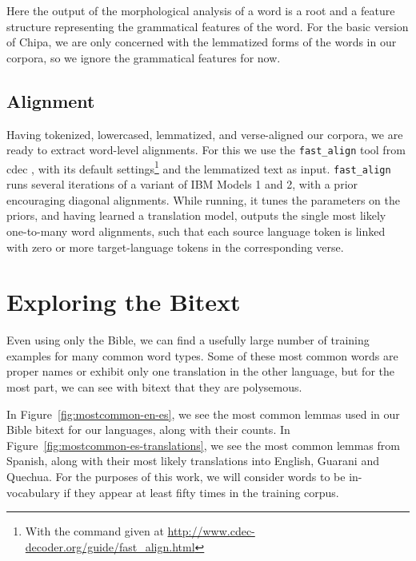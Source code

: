 Here the output of the morphological analysis of a word is a root and a feature
structure representing the grammatical features of the word.  For the basic
version of Chipa, we are only concerned with the lemmatized forms of the words
in our corpora, so we ignore the grammatical features for now.

\subsection{Alignment}
Having tokenized, lowercased, lemmatized, and verse-aligned our corpora, we
are ready to extract word-level alignments.
For this we use the \texttt{fast\_align} tool from cdec
\cite{dyer-EtAl:2010:Demos}, with its default settings\footnote{With the
command given at \url{http://www.cdec-decoder.org/guide/fast_align.html}} and
the lemmatized text as input.
\texttt{fast\_align} runs several iterations of a variant of IBM
Models 1 and 2, with a prior encouraging diagonal alignments. While running, it
tunes the parameters on the priors, and having learned a translation model,
outputs the single most likely one-to-many word alignments, such that each
source language token is linked with zero or more target-language tokens in the
corresponding verse.

\section{Exploring the Bitext}
Even using only the Bible, we can find a usefully large number of training
examples for many common word types. Some of these most common words are proper
names or exhibit only one translation in the other language, but for the most
part, we can see with bitext that they are polysemous.

In Figure~\ref{fig:mostcommon-en-es}, we see the most common lemmas used in our
Bible bitext for our languages, along with their counts. In
Figure~\ref{fig:mostcommon-es-translations}, we see the most common lemmas from
Spanish, along with their most likely translations into English, Guarani and
Quechua. For the purposes of this work, we will consider words to be
in-vocabulary if they appear at least fifty times in the training corpus.

